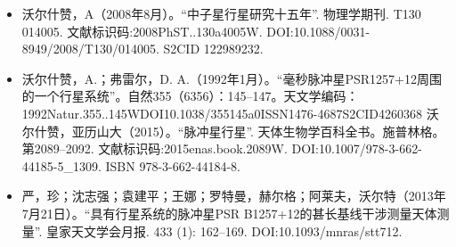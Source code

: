 \begin{itemize}
\item 沃尔什赞，A（2008年8月）。“中子星行星研究十五年”. 物理学期刊. T130 014005. 文献标识码:2008PhST..130a4005W. DOI:10.1088/0031-8949/2008/T130/014005. S2CID 122989232.
\item 沃尔什赞，A.；弗雷尔，D. A.（1992年1月）。“毫秒脉冲星PSR1257+12周围的一个行星系统”。自然355（6356）：145–147。天文学编码：1992Natur.355..145WDOI10.1038/355145a0ISSN1476-4687S2CID4260368
沃尔什赞，亚历山大（2015）。“脉冲星行星”. 天体生物学百科全书。施普林格。第2089–2092. 文献标识码:2015enas.book.2089W. DOI:10.1007/978-3-662-44185-5_1309. ISBN 978-3-662-44184-8.
\item 严，珍；沈志强；袁建平；王娜；罗特曼，赫尔格；阿莱夫，沃尔特（2013年7月21日）。“具有行星系统的脉冲星PSR B1257+12的甚长基线干涉测量天体测量”. 皇家天文学会月报. 433 (1): 162–169. DOI:10.1093/mnras/stt712.
\end{itemize}